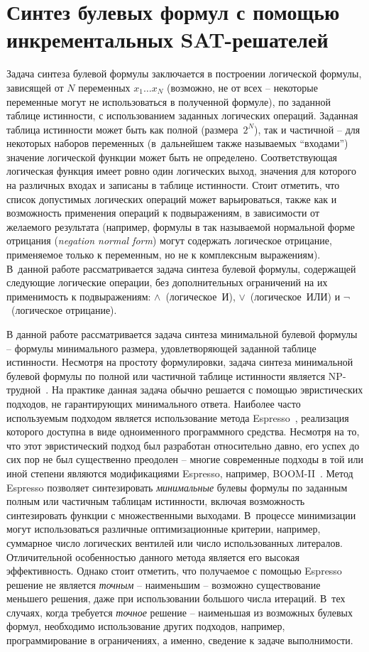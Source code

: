 \section{Синтез булевых формул с помощью инкрементальных SAT-решателей}
\label{sec:formula-synthesis}

Задача синтеза булевой формулы заключается в построении логической формулы, зависящей от $N$ переменных $x_{1}\ldots x_{N}$ (возможно, не от всех \--- некоторые переменные могут не использоваться в полученной формуле), по заданной таблице истинности, с использованием заданных логических операций.
Заданная таблица истинности может быть как полной (размера~$2^{N}$), так и частичной \--- для некоторых наборов переменных (в~дальнейшем также называемых \enquote{входами}) значение логической функции может быть не определено.
Соответствующая логическая функция имеет ровно один логических выход, значения для которого на различных входах и записаны в таблице истинности.
Стоит отметить, что список допустимых логических операций может варьироваться, также как и возможность применения операций к подвыражениям, в зависимости от желаемого результата (например, формулы в так называемой нормальной форме отрицания (\textit{negation normal form}) могут содержать логическое отрицание, применяемое только к переменным, но не к комплексным выражениям).
В~данной работе рассматривается задача синтеза булевой формулы, содержащей следующие логические операции, без дополнительных ограничений на их применимость к подвыражениям: $\land$~(логическое~И), $\lor$~(логическое~ИЛИ) и $\neg$~(логическое отрицание).

В данной работе рассматривается задача синтеза минимальной булевой формулы \--- формулы минимального размера, удовлетворяющей заданной таблице истинности.
Несмотря на простоту формулировки, задача синтеза минимальной булевой формулы по полной или частичной таблице истинности является NP-трудной~\cite{akshay2018}.
На практике данная задача обычно решается с помощью эвристических подходов, не гарантирующих минимального ответа.
Наиболее часто используемым подходом является использование метода Espresso~\cite{brayton1984}, реализация которого доступна в виде одноименного программного средства.
Несмотря на то, что этот эвристический подход был разработан относительно давно, его успех до сих пор не был существенно преодолен \--- многие современные подходы в той или иной степени являются модификациями Espresso, например, BOOM-II~\cite{fiser2006}.
Метод Espresso позволяет синтезировать \emph{минимальные} булевы формулы по заданным полным или частичным таблицам истинности, включая возможность синтезировать функции с множественными выходами.
В~процессе минимизации могут использоваться различные оптимизационные критерии, например, суммарное число логических вентилей или число использованных литералов.
Отличительной особенностью данного метода является его высокая эффективность.
Однако стоит отметить, что получаемое с помощью Espresso решение не является \emph{точным} \--- наименьшим \--- возможно существование меньшего решения, даже при использовании большого числа итераций.
В~тех случаях, когда требуется \emph{точное} решение \--- наименьшая из возможных булевых формул, необходимо использование других подходов, например, программирование в ограничениях, а именно, сведение к задаче выполнимости.

